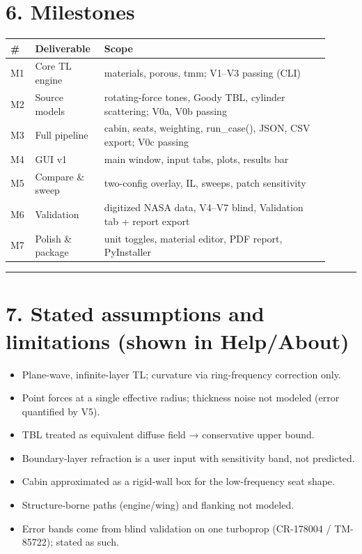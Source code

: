 \documentclass[10pt,a4paper]{article}
\begin{document}
\section*{6. Milestones}

{\small
\begin{longtable}{>{\raggedright\arraybackslash}p{0.057\linewidth}>{\raggedright\arraybackslash}p{0.190\linewidth}>{\raggedright\arraybackslash}p{0.664\linewidth}}
\hline
\textbf{\#} & \textbf{Deliverable} & \textbf{Scope} \\
\hline
\endhead
M1 & Core TL engine & materials, porous, tmm; V1–V3 passing (CLI) \\
M2 & Source models & rotating-force tones, Goody TBL, cylinder scattering; V0a, V0b passing \\
M3 & Full pipeline & cabin, seats, weighting, run\_case(), JSON, CSV export; V0c passing \\
M4 & GUI v1 & main window, input tabs, plots, results bar \\
M5 & Compare \& sweep & two-config overlay, IL, sweeps, patch sensitivity \\
M6 & Validation & digitized NASA data, V4–V7 blind, Validation tab + report export \\
M7 & Polish \& package & unit toggles, material editor, PDF report, PyInstaller \\
\hline
\end{longtable}}

\noindent\rule{\linewidth}{0.4pt}

\section*{7. Stated assumptions and limitations (shown in Help/About)}

\begin{itemize}
\item Plane-wave, infinite-layer TL; curvature via ring-frequency correction only.
\item Point forces at a single effective radius; thickness noise not modeled (error quantified by V5).
\item TBL treated as equivalent diffuse field → conservative upper bound.
\item Boundary-layer refraction is a user input with sensitivity band, not predicted.
\item Cabin approximated as a rigid-wall box for the low-frequency seat shape.
\item Structure-borne paths (engine/wing) and flanking not modeled.
\item Error bands come from blind validation on one turboprop (CR-178004 / TM-85722); stated as such.
\end{itemize}
\end{document}
